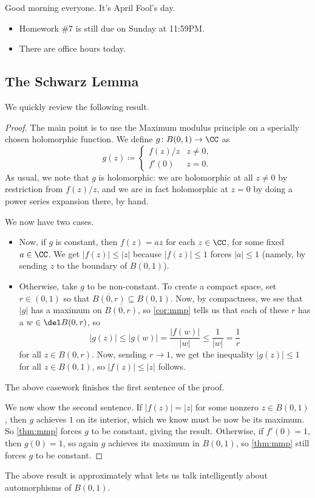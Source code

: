 
Good morning everyone. It's April Fool's day.
\begin{itemize}
	\item Homework \#7 is still due on Sunday at 11:59PM.
	\item There are office hours today.
\end{itemize}

\subsection{The Schwarz Lemma}
We quickly review the following result.
\schwarzlemma*
\begin{proof}
	The main point is to use the Maximum modulus principle on a specially chosen holomorphic function. We define $g\colon B(0,1)\to\CC$ as
	\[g(z)\coloneqq \begin{cases}
		f(z)/z & z\ne0, \\
		f'(0) & z=0.
	\end{cases}\]
	As usual, we note that $g$ is holomorphic: we are holomorphic at all $z\ne0$ by restriction from $f(z)/z$, and we are in fact holomorphic at $z=0$ by doing a power series expansion there, by hand.

	We now have two cases.
	\begin{itemize}
		\item Now, if $g$ is constant, then $f(z)=az$ for each $z\in\CC$, for some fixed $a\in\CC$. We get $|f(z)|\le|z|$ because $|f(z)|\le1$ forces $|a|\le1$ (namely, by sending $z$ to the boundary of $B(0,1)$).
		\item Otherwise, take $g$ to be non-constant. To create a compact space, set $r\in(0,1)$ so that $\overline{B(0,r)}\subseteq B(0,1)$. Now, by compactness, we see that $|g|$ has a maximum on $\overline{B(0,r)}$, so \autoref{cor:mmp} tells us that each of these $r$ has a $w\in\del B(0,r)$, so
		\[|g(z)|\le|g(w)|=\frac{|f(w)|}{|w|}\le\frac1{|w|}=\frac1r\]
		for all $z\in B(0,r)$. Now, sending $r\to 1$, we get the inequality $|g(z)|\le1$ for all $z\in B(0,1)$, so $|f(z)|\le|z|$ follows.
	\end{itemize}
	The above casework finishes the first sentence of the proof.

	We now show the second sentence. If $|f(z)|=|z|$ for some nonzero $z\in B(0,1)$, then $g$ achieves $1$ on its interior, which we know must be now be its maximum. So \autoref{thm:mmp} forces $g$ to be constant, giving the result. Otherwise, if $f'(0)=1$, then $g(0)=1$, so again $g$ achieves its maximum in $B(0,1)$, so \autoref{thm:mmp} still forces $g$ to be constant.
\end{proof}
\begin{remark}
	The above result is approximately what lets us talk intelligently about automorphisms of $B(0,1)$.
\end{remark}

